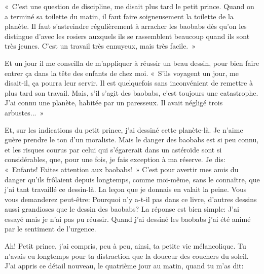 \documentclass[a4paper]{report}
\begin{document}

«~C'est une question de discipline, me disait plus tard le petit prince. Quand on a terminé sa toilette du matin, il faut faire soigneusement la toilette de la planète. Il faut s'astreindre régulièrement à arracher les baobabs dès qu'on les distingue d'avec les rosiers auxquels ils se rassemblent beaucoup quand ils sont très jeunes. C'est un travail très ennuyeux, mais très facile.~» 


Et un jour il me conseilla de m'appliquer à réussir un beau dessin, pour bien faire entrer ça dans la tête des enfants de chez moi. «~S'ils voyagent un jour, me disait-il, ça pourra leur servir. Il est quelquefois sans inconvénient de remettre à plus tard son travail. Mais, s'il s'agit des baobabs, c'est toujours une catastrophe. J'ai connu une planète, habitée par un paresseux. Il avait négligé trois arbustes...~»

Et, sur les indications du petit prince, j'ai dessiné cette planète-là. Je n'aime guère prendre le ton d'un moraliste. Mais le danger des baobabs est si peu connu, et les risques courus par celui qui s'égarerait dans un astéroïde sont si considérables, que, pour une fois, je fais exception à ma réserve. Je dis: «~Enfants! Faites attention aux baobabs!~» C'est pour avertir mes amis du danger qu'ils frôlaient depuis longtemps, comme moi-même, sans le connaître, que j'ai tant travaillé ce dessin-là. La leçon que je donnais en valait la peine. Vous vous demanderez peut-être: Pourquoi n'y a-t-il pas dans ce livre, d'autres dessins aussi grandioses que le dessin des baobabs? La réponse est bien simple: J'ai essayé mais je n'ai pas pu réussir. Quand j'ai dessiné les baobabs j'ai été animé par le sentiment de l'urgence.

\parachapter[VI]{} %
Ah! Petit prince, j'ai compris, peu à peu, ainsi, ta petite vie mélancolique. Tu n'avais eu longtemps pour ta distraction que la douceur des couchers du soleil. J'ai appris ce détail nouveau, le quatrième jour au matin, quand tu m'as dit:
\end{document}
